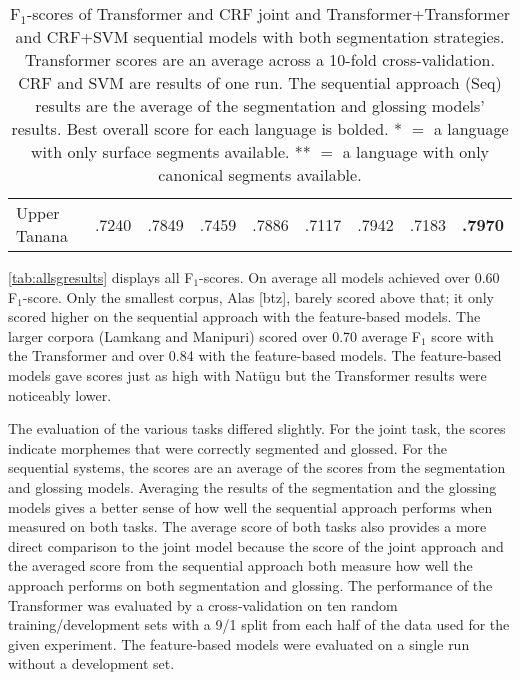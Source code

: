 \begin{table}[!tb]
\begin{tabular}{l|cc|cc|cc|cc}
         \hline
         Upper Tanana & .7240 & .7849 & .7459 & .7886
                      & .7117 & .7942 & .7183 & \textbf{.7970} \\
    \end{tabular}
    \caption[Results of All Segmentation and Glossing Models]{F$_1$-scores of Transformer and CRF joint and Transformer+Transformer and CRF+SVM sequential models with both segmentation strategies. Transformer scores are an average across a 10-fold cross-validation. CRF and SVM are results of one run. The sequential approach (Seq) results are the average of the segmentation and glossing models' results. Best overall score for each language is bolded. * $=$ a language with only surface segments available. ** $=$ a language with only canonical segments available.}
    \label{tab:allsgresults}
\end{table}


\autoref{tab:allsgresults} displays all F$_1$-scores. On average all models achieved over 0.60 F$_1$-score. Only the smallest corpus, Alas [btz], barely scored above that; it only scored higher on the sequential approach with the feature-based models. The larger corpora (Lamkang and Manipuri) scored over 0.70 average F$_1$ score with the Transformer and over 0.84 with the feature-based models. The feature-based models gave scores just as high with Nat\"ugu but the Transformer results were noticeably lower.

The evaluation of the various tasks differed slightly. For the joint task, the scores indicate morphemes that were correctly segmented and glossed. For the sequential systems, the scores are an average of the scores from the segmentation and glossing models. Averaging the results of the segmentation and the glossing models gives a better sense of how well the sequential approach performs when measured on both tasks. The average score of both tasks also provides a more direct comparison to the joint model because the score of the joint approach and the averaged score from the sequential approach both measure how well the approach performs on both segmentation and glossing. The performance of the Transformer was evaluated by a cross-validation on ten random training/development sets with a 9/1 split from each half of the data used for the given experiment. The feature-based models were evaluated on a single run without a development set. 



